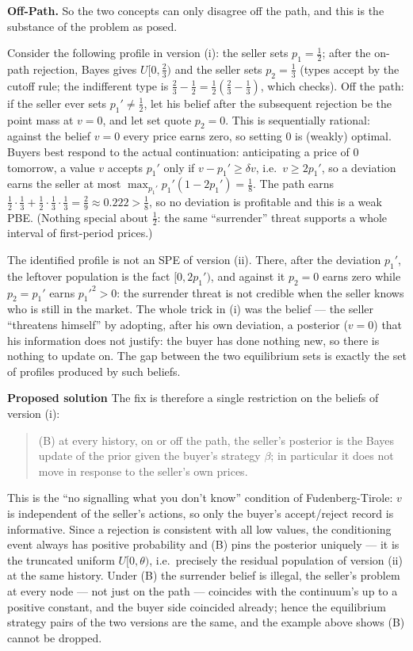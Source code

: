 \documentclass[12pt]{article}
\begin{document}
\textbf{Off-Path.}
So the two concepts can only disagree off the path, and this is the substance of the problem as posed.

Consider the following profile in version (i): the seller sets $p_1 =
\tfrac12$; after the on-path rejection, Bayes gives $U[0, \tfrac23)$ and the
seller sets $p_2 = \tfrac13$ (types accept by the cutoff rule; the
indifferent type is $\tfrac23 - \tfrac12 = \tfrac12(\tfrac23 - \tfrac13)$,
which checks). Off the path: if the seller ever sets $p_1' \ne \tfrac12$,
let his belief after the subsequent rejection be the point mass at $v = 0$,
and let set quote $p_2 = 0$. This is sequentially rational: against the belief
$v = 0$ every price earns zero, so setting $0$ is (weakly) optimal. Buyers
best respond to the actual continuation: anticipating a price of $0$ tomorrow,
a value $v$ accepts $p_1'$ only if $v - p_1' \ge \delta v$, i.e.\ $v \ge
2p_1'$, so a deviation earns the seller at most $\max_{p_1'} p_1'(1 - 2p_1')
= \tfrac18$. The path earns $\tfrac12 \cdot \tfrac13 + \tfrac12 \cdot
\tfrac13 \cdot \tfrac13 = \tfrac29 \approx 0.222 > \tfrac18$, so no deviation
is profitable and this is a weak PBE. (Nothing special about $\tfrac12$: the
same ``surrender'' threat supports a whole interval of first-period prices.)
 
The identified profile is not an SPE of version (ii). There, after the
deviation $p_1'$, the leftover population is the fact $[0, 2p_1')$, and
against it $p_2 = 0$ earns zero while $p_2 = p_1'$ earns $p_1'^2 > 0$: the
surrender threat is not credible when the seller knows who is still in the
market. The whole trick in (i) was the belief --- the seller ``threatens
himself'' by adopting, after his own deviation, a posterior ($v = 0$) that his
information does not justify: the buyer has done nothing new, so there is
nothing to update on. The gap between the two equilibrium sets is exactly the
set of profiles produced by such beliefs.
 
\textbf{Proposed solution}
The fix is therefore a single restriction on the beliefs of version (i):
\begin{quote}
(B) at every history, on or off the path, the seller's posterior is the Bayes
update of the prior given the buyer's strategy $\beta$; in particular it does
not move in response to the seller's own prices.
\end{quote}
This is the ``no signalling what you don't know'' condition of
Fudenberg-Tirole: $v$ is independent of the seller's actions, so only the
buyer's accept/reject record is informative. Since a rejection is consistent
with all low values, the conditioning event always has positive probability
and (B) pins the posterior uniquely --- it is the truncated uniform
$U[0,\theta)$, i.e.\ precisely the residual population of version (ii) at the
same history. Under (B) the surrender belief is illegal, the seller's problem
at every node --- not just on the path --- coincides with the continuum's up
to a positive constant, and the buyer side coincided already; hence the
equilibrium strategy pairs of the two versions are the same, and the example
above shows (B) cannot be dropped. 
\end{document}
